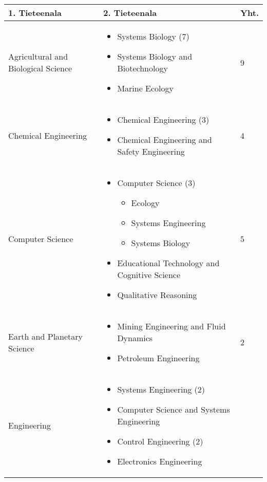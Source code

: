 \documentclass[utf8]{gradu3}
\begin{document}
\begin{longtable}[]{|p{5cm}|p{8cm}|p{1cm}|}
    \hline
    \textbf{1. Tieteenala}    & \textbf{2. Tieteenala} & \textbf{Yht.} \\
    \hline
    Agricultural and Biological Science  & \begin{itemize}
        \item Systems Biology (7)
        \item Systems Biology and Biotechnology 
        \item Marine Ecology
    \end{itemize} & 9 \\
    \hline
    Chemical Engineering & \begin{itemize}
        \item Chemical Engineering (3)
        \item Chemical Engineering and Safety Engineering 
    \end{itemize} & 4 \\
    \hline
    Computer Science & \begin{itemize}
        \item Computer Science (3)
        \begin{itemize}
            \item Ecology
            \item Systems Engineering
            \item Systems Biology
        \end{itemize}
        \item Educational Technology and Cognitive Science
        \item Qualitative Reasoning
    \end{itemize} & 5 \\
    \hline
    Earth and Planetary Science & \begin{itemize}
        \item Mining Engineering and Fluid Dynamics
        \item Petroleum Engineering
    \end{itemize} & 2 \\
    \hline
    Engineering & \begin{itemize}
        \item Systems Engineering (2)
        \item Computer Science and Systems Engineering 
        \item Control Engineering (2)
        \item Electronics Engineering

\end{itemize}
\end{longtable}
\end{document}
